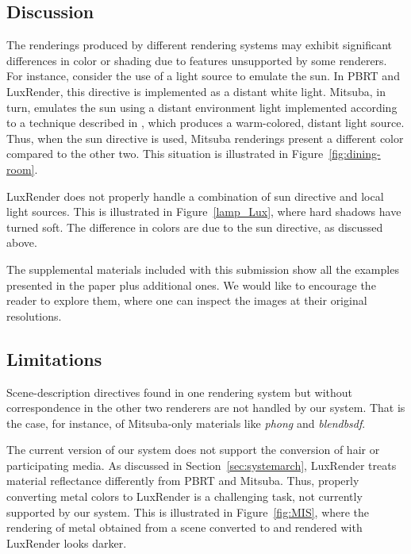 \subsection{Discussion}

The renderings produced by different rendering systems may exhibit significant differences in color or shading due to features unsupported by some renderers.  
For instance, consider the use of a light source to emulate the sun. In PBRT and LuxRender, this directive is implemented as a distant white light.
Mitsuba, in turn, emulates the sun using a distant environment light implemented according to a technique 
described in \cite{Preetham}, which produces a warm-colored, distant light source. Thus, when the sun directive is used, Mitsuba renderings present a different color compared to the other two. This situation is illustrated in Figure~\ref{fig:dining-room}.

LuxRender does not properly handle a combination of sun directive and local light sources. This is illustrated in Figure~\ref{lamp_Lux}, where hard shadows have turned soft. The difference in colors are due to the sun directive, as discussed above.

The supplemental materials included with this submission show all the examples presented in the paper plus additional ones. We would like to encourage the reader to explore them, where one can inspect the images at their original resolutions.

\subsection{Limitations}
Scene-description directives found in one rendering system but without correspondence in the other two renderers are not handled by our system. That is the case, for instance, of Mitsuba-only materials like \textit{phong} and \textit{blendbsdf}. 

The current version of our system does not support the conversion of hair or participating media. 
%
As discussed in Section~\ref{sec:systemarch}, LuxRender treats material reflectance differently from PBRT and Mitsuba. Thus, properly converting metal colors to LuxRender is a challenging task, not currently supported by our system. This is illustrated in Figure~\ref{fig:MIS}, where the rendering of metal obtained from a scene converted to and rendered with LuxRender looks darker.  

